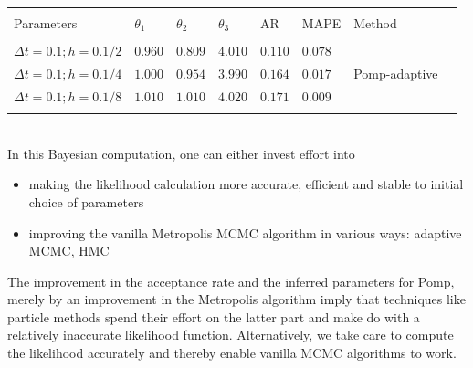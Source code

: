 \documentclass[graybox]{svmult}
\begin{document}
\vspace{-4mm}
\setlength{\tabcolsep}{8pt}
\begin{table}[!htbp] \centering 

\begin{tabular}{llllllll} 
\\[-1.8ex]\hline 
\hline \\[-1.8ex] 
Parameters & $\theta_1$ & $\theta_2$ & $\theta_3$ & AR & MAPE & Method \\ 
\hline \\[-1.8ex] 
$\Delta t = 0.1; h = 0.1/2$ & $0.960$ & $0.809$ & $4.010$ & $0.110$ & $0.078$ & \\ 
$\Delta t = 0.1; h = 0.1/4$ & $1.000$ & $0.954$ & $3.990$ & $0.164$ & $0.017$ & Pomp-adaptive \\ 
$\Delta t = 0.1; h = 0.1/8$ & $1.010$ & $1.010$ & $4.020$ & $0.171$ & $0.009$ & \\ 
\hline \\[-1.8ex] 
\end{tabular} 
\end{table} 
\vspace{-5mm}
\\
In this Bayesian computation, one can either invest effort into 
\begin{itemize}
\item making the likelihood calculation more accurate, efficient and stable to initial choice of parameters
\item improving the vanilla Metropolis MCMC algorithm in various ways: adaptive MCMC, HMC \cite{gelman2014bayesian}
\end{itemize}
The improvement in the acceptance rate and the inferred parameters for Pomp, merely by an improvement in the Metropolis algorithm imply that techniques like particle methods spend their effort on the latter part and make do with a relatively inaccurate likelihood function. Alternatively, we take care to compute the likelihood accurately and thereby enable vanilla MCMC algorithms to work.
\end{document}
